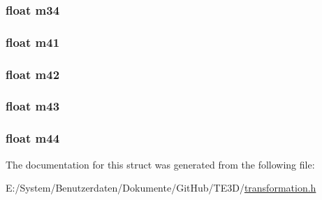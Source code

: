 \hypertarget{struct_t_e3_d___matrix4x4f_a47f48dd782d9aecaeb991c731644a403}{
\subsubsection[{m34}]{\setlength{\rightskip}{0pt plus 5cm}float m34}}\label{struct_t_e3_d___matrix4x4f_a47f48dd782d9aecaeb991c731644a403}
\hypertarget{struct_t_e3_d___matrix4x4f_a3882cc332843de4149f6c5ff5af1bb86}{
\subsubsection[{m41}]{\setlength{\rightskip}{0pt plus 5cm}float m41}}\label{struct_t_e3_d___matrix4x4f_a3882cc332843de4149f6c5ff5af1bb86}
\hypertarget{struct_t_e3_d___matrix4x4f_a9bd4e6d41a5feff4bab28073660271c5}{
\subsubsection[{m42}]{\setlength{\rightskip}{0pt plus 5cm}float m42}}\label{struct_t_e3_d___matrix4x4f_a9bd4e6d41a5feff4bab28073660271c5}
\hypertarget{struct_t_e3_d___matrix4x4f_a1b674f7005a1d63c42667b35f54ec444}{
\subsubsection[{m43}]{\setlength{\rightskip}{0pt plus 5cm}float m43}}\label{struct_t_e3_d___matrix4x4f_a1b674f7005a1d63c42667b35f54ec444}
\hypertarget{struct_t_e3_d___matrix4x4f_a0eee6f390968c7309d0a4ae6f1bb3e57}{
\subsubsection[{m44}]{\setlength{\rightskip}{0pt plus 5cm}float m44}}\label{struct_t_e3_d___matrix4x4f_a0eee6f390968c7309d0a4ae6f1bb3e57}


The documentation for this struct was generated from the following file\-:\begin{DoxyCompactItemize}
\item 
E\-:/\-System/\-Benutzerdaten/\-Dokumente/\-Git\-Hub/\-T\-E3\-D/\hyperlink{transformation_8h}{transformation.\-h}\end{DoxyCompactItemize}
